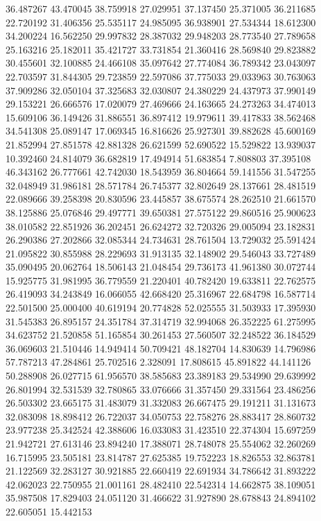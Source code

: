 36.487267
43.470045
38.759918
27.029951
37.137450
25.371005
36.211685
22.720192
31.406356
25.535117
24.985095
36.938901
27.534344
18.612300
34.200224
16.562250
29.997832
28.387032
29.948203
28.773540
27.789658
25.163216
25.182011
35.421727
33.731854
21.360416
28.569840
29.823882
30.455601
32.100885
24.466108
35.097642
27.774084
36.789342
23.043097
22.703597
31.844305
29.723859
22.597086
37.775033
29.033963
30.763063
37.909286
32.050104
37.325683
32.030807
24.380229
24.437973
37.990149
29.153221
26.666576
17.020079
27.469666
24.163665
24.273263
34.474013
15.609106
36.149426
31.886551
36.897412
19.979611
39.417833
38.562468
34.541308
25.089147
17.069345
16.816626
25.927301
39.882628
45.600169
21.852994
27.851578
42.881328
26.621599
52.690522
15.529822
13.939037
10.392460
24.814079
36.682819
17.494914
51.683854
7.808803
37.395108
46.343162
26.777661
42.742030
18.543959
36.804664
59.141556
31.547255
32.048949
31.986181
28.571784
26.745377
32.802649
28.137661
28.481519
22.089666
39.258398
20.830596
23.445857
38.675574
28.262510
21.661570
38.125886
25.076846
29.497771
39.650381
27.575122
29.860516
25.900623
38.010582
22.851926
36.202451
26.624272
32.720326
29.005094
23.182831
26.290386
27.202866
32.085344
24.734631
28.761504
13.729032
25.591424
21.095822
30.855988
28.229693
31.913135
32.148902
29.546043
33.727489
35.090495
20.062764
18.506143
21.048454
29.736173
41.961380
30.072744
15.925775
31.981995
36.779559
21.220401
40.782420
19.633811
22.762575
26.419093
34.243849
16.066055
42.668420
25.316967
22.684798
16.587714
22.501500
25.000400
40.619194
20.774828
52.025555
31.503933
17.395930
31.545383
26.895157
24.351784
37.314719
32.994068
26.352225
61.275995
34.623752
21.520858
51.165854
30.261453
27.560507
32.248522
36.184529
36.069603
21.510446
14.949414
50.709421
48.182704
14.830639
14.796986
57.787213
47.284861
25.702516
2.328091
17.808615
45.891822
44.141126
50.288908
26.027715
61.956570
38.585683
23.389183
29.534990
29.639992
26.801994
32.531539
32.780865
33.076666
31.357450
29.331564
23.486256
26.503302
23.665175
31.483079
31.332083
26.667475
29.191211
31.131673
32.083098
18.898412
26.722037
34.050753
22.758276
28.883417
28.860732
23.977238
25.342524
42.388606
16.033083
31.423510
22.374304
15.697259
21.942721
27.613146
23.894240
17.388071
28.748078
25.554062
32.260269
16.715995
23.505181
23.814787
27.625385
19.752223
18.826553
32.863781
21.122569
32.283127
30.921885
22.660419
22.691934
34.786642
31.893222
42.062023
22.750955
21.001161
28.482410
22.542314
14.662875
38.109051
35.987508
17.829403
24.051120
31.466622
31.927890
28.678843
24.894102
22.605051
15.442153
